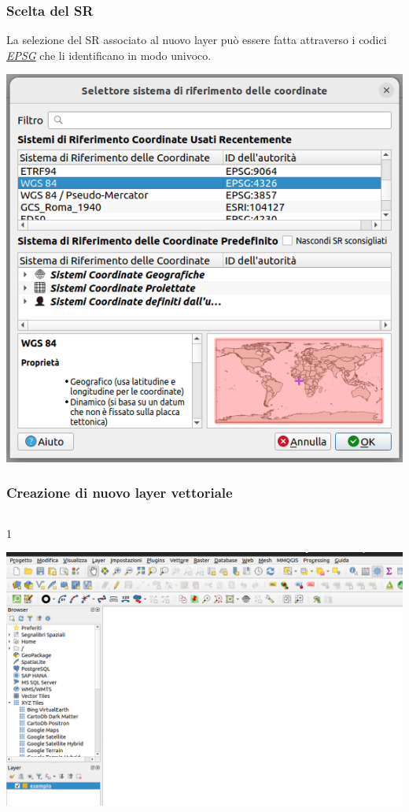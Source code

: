 \documentclass{beamer}
\begin{document}
{\begin{frame}
    \frametitle{Scelta del SR}
    La selezione del SR associato al nuovo layer può essere fatta attraverso i codici     \href{http://www.epsg.org/}{\textcolor{gter}{\emph{EPSG}}} che li identificano in modo univoco.
    \begin{center}
        \includegraphics[height=.75\textheight] {digitizing_pics/Scelta SR.png}
    \end{center}
\end{frame} 


\begin{frame}
   \frametitle{Creazione di nuovo layer vettoriale}
 	\begin{columns}
		\begin{column} {1\textwidth}	
			 \begin{center}
			\includegraphics[width=1\textwidth] {corso2023/esempio poligono.png}
		    \end{center}
		\end{column}
 		

\end{columns}
\end{frame}}
\end{document}
